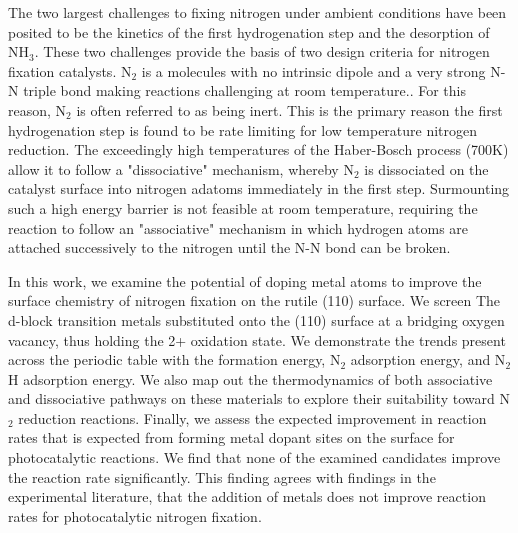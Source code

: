 \documentclass[catalysts,article,submit,moreauthors,pdftex,10pt,a4paper]{mdpi}
\theoremstyle{mdpi}
\newcounter{ex}
\newcounter{re}
\theoremstyle{mdpidefinition}
\begin{document}


The two largest challenges to fixing nitrogen under ambient conditions have been posited to be the kinetics of the first hydrogenation step and the desorption of NH$_3$.\cite{Hoskuldsson_2017,Singh_2017,Montoya_2015} These two challenges provide the basis of two design criteria for nitrogen fixation catalysts. N$_2$ is a molecules with no intrinsic dipole and a very strong N-N triple bond making reactions challenging at room temperature.\cite{Montoya_2015,Comer_2018}. For this reason, N$_2$ is often referred to as being inert. This is the primary reason the first hydrogenation step is found to be rate limiting for low temperature nitrogen reduction.\cite{Montoya_2015, Singh_2017, Hoskuldsson_2017, Comer_2018} The exceedingly high temperatures of the Haber-Bosch process (700K) allow it to follow a "dissociative" mechanism, whereby N$_2$ is dissociated on the catalyst surface into nitrogen adatoms immediately in the first step.\cite{Ullmann_amm_2006, Hellman_2006} Surmounting such a high energy barrier is not feasible at room temperature, requiring the reaction to follow an "associative" mechanism in which hydrogen atoms are attached successively to the nitrogen until the N-N bond can be broken.\cite{Montoya_2015}

In this work, we examine the potential of doping metal atoms to improve the surface chemistry of nitrogen fixation on the rutile (110) surface. We screen The d-block transition metals substituted onto the (110) surface at a bridging oxygen vacancy, thus holding the 2+ oxidation state. We demonstrate the trends present across the periodic table with the formation energy, N$_2$ adsorption energy, and N$_2$H adsorption energy. We also map out the thermodynamics of both associative and dissociative pathways on these materials to explore their suitability toward N$_2$ reduction reactions. Finally, we assess the expected improvement in reaction rates that is expected from forming metal dopant sites on the surface for photocatalytic reactions. We find that none of the examined candidates improve the reaction rate significantly. This finding agrees with findings in the experimental literature, that the addition of metals does not improve reaction rates for photocatalytic nitrogen fixation.
\end{document}
